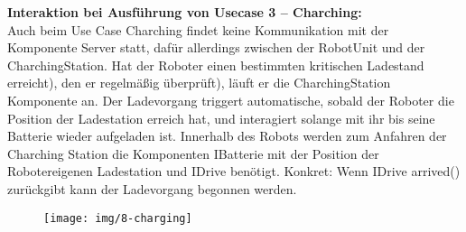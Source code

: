 	\textbf{Interaktion bei Ausführung von Usecase 3 – Charching:}\\
	Auch beim Use Case Charching findet keine Kommunikation mit der Komponente Server statt, dafür allerdings zwischen der RobotUnit und der CharchingStation. Hat der Roboter einen bestimmten kritischen Ladestand erreicht), den er regelmäßig überprüft), läuft er die CharchingStation Komponente an. Der Ladevorgang triggert automatische, sobald der Roboter die Position der Ladestation erreich hat, und interagiert solange mit ihr bis seine Batterie wieder aufgeladen ist. Innerhalb des Robots werden zum Anfahren der Charching Station die Komponenten IBatterie mit der Position der Robotereigenen Ladestation und IDrive benötigt. Konkret: Wenn IDrive arrived() zurückgibt kann der Ladevorgang begonnen werden.\\
	\begin{figure}[H]
		\centering
		\texttt{[image: img/8-charging]}
		\label{Charching}
	\end{figure}
